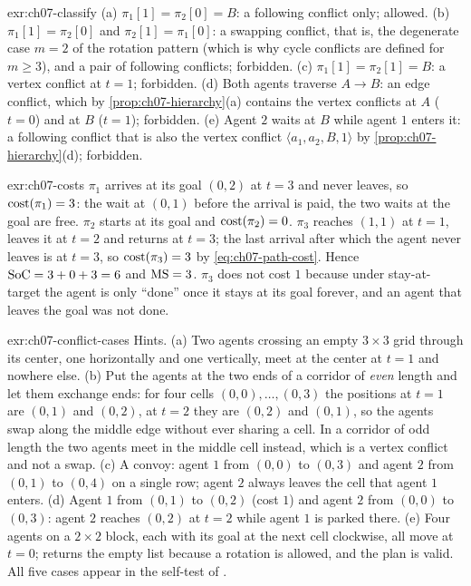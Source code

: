 
\begin{solution}{exr:ch07-classify}
(a) $\pi_1[1]=\pi_2[0]=B$: a following conflict only; allowed. (b) $\pi_1[1]=\pi_2[0]$ and $\pi_2[1]=\pi_1[0]$: a swapping conflict, that is, the degenerate case $m=2$ of the rotation pattern (which is why cycle conflicts are defined for $m\ge3$), and a pair of following conflicts; forbidden. (c) $\pi_1[1]=\pi_2[1]=B$: a vertex conflict at $t=1$; forbidden. (d) Both agents traverse $A\to B$: an edge conflict, which by \cref{prop:ch07-hierarchy}(a) contains the vertex conflicts at $A$ ($t=0$) and at $B$ ($t=1$); forbidden. (e) Agent $2$ waits at $B$ while agent $1$ enters it: a following conflict that is also the vertex conflict $\langle a_1,a_2,B,1\rangle$ by \cref{prop:ch07-hierarchy}(d); forbidden.
\end{solution}

\begin{solution}{exr:ch07-costs}
$\pi_1$ arrives at its goal $(0,2)$ at $t=3$ and never leaves, so $\operatorname{cost}(\pi_1)=3$: the wait at $(0,1)$ before the arrival is paid, the two waits at the goal are free. $\pi_2$ starts at its goal and $\operatorname{cost}(\pi_2)=0$. $\pi_3$ reaches $(1,1)$ at $t=1$, leaves it at $t=2$ and returns at $t=3$; the last arrival after which the agent never leaves is at $t=3$, so $\operatorname{cost}(\pi_3)=3$ by \cref{eq:ch07-path-cost}. Hence $\mathrm{SoC}=3+0+3=6$ and $\mathrm{MS}=3$. $\pi_3$ does not cost $1$ because under stay-at-target the agent is only ``done'' once it stays at its goal forever, and an agent that leaves the goal was not done.
\end{solution}

\begin{solution}{exr:ch07-conflict-cases}
Hints. (a) Two agents crossing an empty $3\times3$ grid through its center, one horizontally and one vertically, meet at the center at $t=1$ and nowhere else. (b) Put the agents at the two ends of a corridor of \emph{even} length and let them exchange ends: for four cells $(0,0),\dots,(0,3)$ the positions at $t=1$ are $(0,1)$ and $(0,2)$, at $t=2$ they are $(0,2)$ and $(0,1)$, so the agents swap along the middle edge without ever sharing a cell. In a corridor of odd length the two agents meet in the middle cell instead, which is a vertex conflict and not a swap. (c) A convoy: agent $1$ from $(0,0)$ to $(0,3)$ and agent $2$ from $(0,1)$ to $(0,4)$ on a single row; agent $2$ always leaves the cell that agent $1$ enters. (d) Agent $1$ from $(0,1)$ to $(0,2)$ (cost $1$) and agent $2$ from $(0,0)$ to $(0,3)$: agent $2$ reaches $(0,2)$ at $t=2$ while agent $1$ is parked there. (e) Four agents on a $2\times2$ block, each with its goal at the next cell clockwise, all move at $t=0$;  returns the empty list because a rotation is allowed, and the plan is valid. All five cases appear in the self-test of .
\end{solution}

